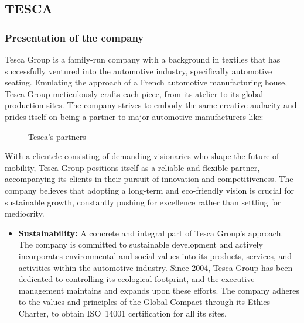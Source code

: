 \subsection{\fontsize{14}{17}\selectfont TESCA}

\subsubsection{\fontsize{13}{16}\selectfont Presentation of the company}

\hspace*{0.777cm} Tesca Group is a family-run company with a background in textiles that has successfully ventured
into the automotive industry, specifically automotive seating. Emulating the approach of a French
automotive manufacturing house, Tesca Group meticulously crafts each piece, from its atelier to its
global production sites\cite{tesca_official}. The company strives to embody the same creative audacity and
prides itself on being a partner to major automotive manufacturers like:

\begin{figure}[H]
    \centering
    \caption{Tesca's partners}
    \label{fig:chapter1-1}
\end{figure}

\hspace*{0.25cm}With a clientele consisting of demanding visionaries who shape the future of mobility, Tesca Group
positions itself as a reliable and flexible partner, accompanying its clients in their pursuit of
innovation and competitiveness. The company believes that adopting a long-term and eco-friendly
vision is crucial for sustainable growth, constantly pushing for excellence rather than settling for
mediocrity\cite{tesca_official}.


\begin{itemize}

    \item \textbf{Sustainability:} A concrete and integral part of Tesca Group's approach. The company is committed to sustainable development and actively incorporates environmental and social values into its products, services, and activities within the automotive industry. Since 2004, Tesca Group has been dedicated to controlling its ecological footprint, and the executive management maintains and expands upon these efforts. The company adheres to the values and principles of the Global Compact through its Ethics Charter, to obtain ISO~14001 certification for all its sites\cite{tesca_official}.

\end{itemize}



